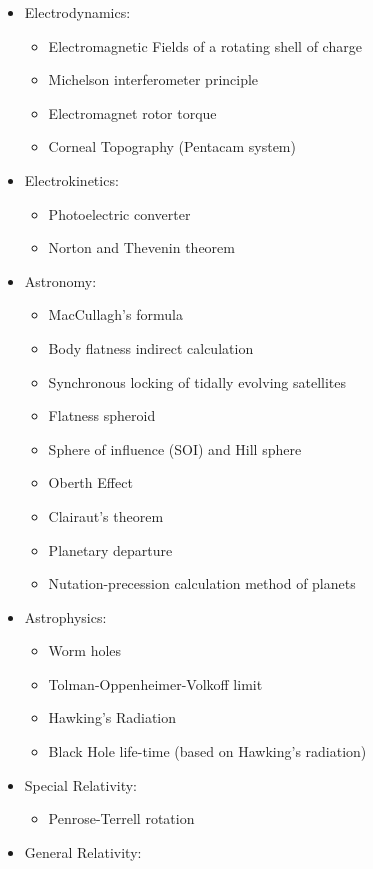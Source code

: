 \begin{itemize}
		\item Electrodynamics:
			\begin{itemize}		
				\item Electromagnetic Fields of a rotating shell of charge
				\item Michelson interferometer principle
				\item Electromagnet rotor torque
				\item Corneal Topography (Pentacam system)
			\end{itemize}
		\item Electrokinetics:
			\begin{itemize}		
				\item Photoelectric converter
				\item Norton and Thevenin theorem
			\end{itemize}
		\item Astronomy:
			\begin{itemize}	
				\item MacCullagh's formula
				\item Body flatness indirect calculation
				\item Synchronous locking of tidally evolving satellites	
				\item Flatness spheroid
				\item Sphere of influence (SOI) and Hill sphere
				\item Oberth Effect
				\item Clairaut’s theorem
				\item Planetary departure
				\item Nutation-precession calculation method of planets
			\end{itemize}
		\item Astrophysics:
			\begin{itemize}	
				\item Worm holes
				\item Tolman-Oppenheimer-Volkoff limit
				\item Hawking's Radiation
				\item Black Hole life-time (based on Hawking's radiation)
			\end{itemize}	
		\item Special Relativity:
			\begin{itemize}	
				\item Penrose-Terrell rotation
			\end{itemize}	
		\item General Relativity:
			\begin{itemize}

\end{itemize}
\end{itemize}
